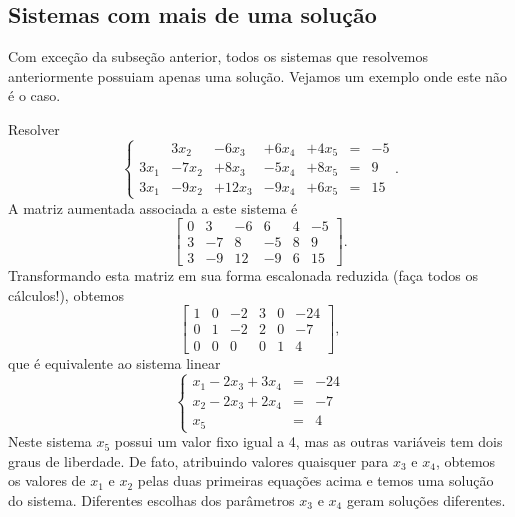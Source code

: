 \documentclass[../livro.tex]{subfiles} %
\begin{document}
\subsection{Sistemas com mais de uma solução}

Com exceção da subseção anterior, todos os sistemas que resolvemos anteriormente possuiam apenas uma solução. Vejamos um exemplo onde este não é o caso.

\begin{example}
Resolver
\begin{equation}
\left\{
  \begin{array}{rrrrrrl}
     & 3 x_2 & -6x_3 & + 6x_4 & + 4x_5 &=& -5\\
    3x_1 & -7x_2 & +8x_3 & -5 x_4 & + 8x_5 &=& 9\\
    3x_1 & -9x_2 & +12x_3 & -9x_4 & +6x_5 &=& 15
  \end{array}
\right. .
\end{equation} A matriz aumentada associada a este sistema é
\begin{equation}
\left[
  \begin{array}{ccccc|c}
    0 &  3 & -6 &  6 & 4 & -5 \\
    3 & -7 &  8 & -5 & 8 &  9 \\
    3 & -9 & 12 & -9 & 6 & 15
  \end{array}
\right] .
\end{equation} Transformando esta matriz em sua forma escalonada reduzida (faça todos os cálculos!), obtemos
\begin{equation}
\left[
  \begin{array}{ccccc|c}
    1 & 0 & -2 & 3 & 0 & -24 \\
    0 & 1 & -2 & 2 & 0 &  -7 \\
    0 & 0 &  0 & 0 & 1 &   4
  \end{array}
\right],
\end{equation} que é equivalente ao sistema linear
\begin{equation}
\left\{
  \begin{array}{rcl}
      x_1 - 2 x_3 + 3 x_4 &=& -24\\
      x_2 - 2 x_3 + 2 x_4  &=& -7\\
      x_5 &=& 4
  \end{array}
\right.
\end{equation} Neste sistema $x_5$ possui um valor fixo igual a 4, mas as outras variáveis tem dois graus de liberdade. De fato, atribuindo valores quaisquer para $x_3$ e $x_4$, obtemos os valores de $x_1$ e $x_2$ pelas duas primeiras equações acima e temos uma solução do sistema. Diferentes escolhas dos parâmetros $x_3$ e $x_4$ geram soluções diferentes.


\end{example}
\end{document}
